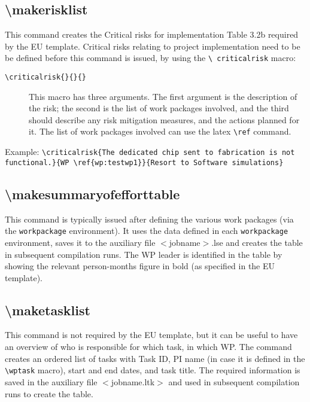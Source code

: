 \documentclass[pdftext]{article}
\begin{document}
\subsection{\textbackslash makerisklist}
This command creates the Critical risks for implementation Table 3.2b required by the
EU template. Critical risks relating to project implementation need to be be defined before this command is issued, by using the  \texttt{\textbackslash
 criticalrisk} macro:
\begin{description}
\item[\texttt{\textbackslash criticalrisk\{\}\{\}\{\}}] This macro
  has three arguments. The first argument is the description of the risk; the second is the list of work packages involved, and the third should describe any risk mitigation measures, and the actions planned for it. The list of work
  packages involved can use the latex \texttt{\textbackslash ref} command.
\end{description}
Example: \texttt{\textbackslash criticalrisk\{The dedicated chip sent to fabrication is not functional.\}\{WP\,\textbackslash ref\{wp:testwp1\}\}\{Resort to Software simulations\}}


\subsection{\textbackslash makesummaryofefforttable}
This command is typically issued after defining the various work
packages (via the \texttt{workpackage} environment). It uses the data
defined in each \texttt{workpackage} environment, saves it to the
auxiliary file $<$jobname$>$.lse and creates the table in subsequent
compilation runs. The WP leader is identified in the table by showing
the relevant person-months figure in bold (as specified in the EU
template).

\subsection{\textbackslash maketasklist}
This command is not required by the EU template, but it can be
useful to have an overview of who is responsible for which task, in
which WP. The command creates an ordered list of tasks with Task ID,
PI name (in case it is defined in the \texttt{\textbackslash wptask}
macro), start and end dates, and task title. The required information
is saved in the auxiliary file $<$jobname.ltk$>$ and used in
subsequent compilation runs to create the table.
\end{document}
